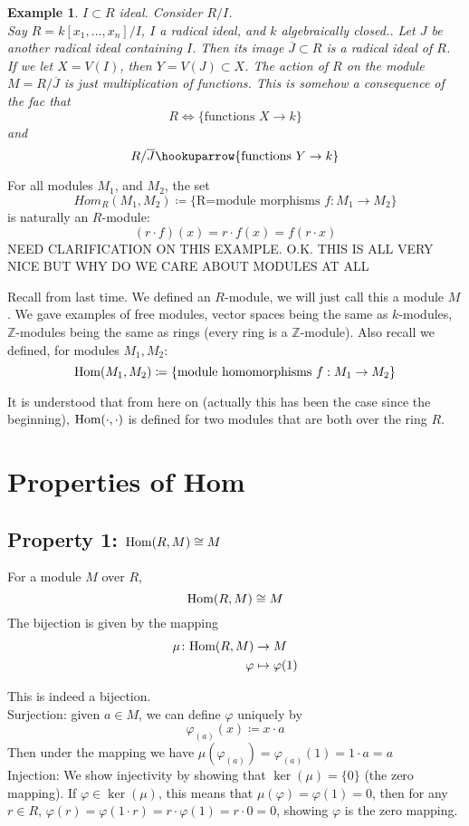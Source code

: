 \documentclass[12pt]{article}
\newcommand{\z}{\mathbb{Z}}
\newcommand{\ho}[2]{\textup{Hom}(#1,#2)}
\newcommand{\mapping}[5]{\begin{align*}
#1\colon #2 &\to #3\\
#4 & \mapsto #5
\end{align*}}
\newtheorem*{eg}{Example}
\theoremstyle{definition}
\begin{document}
\begin{eg}
$I \subset R$ ideal. Consider $R/I$.\\
Say $R=k[x_1,\dots,x_n]/I$, $I$ a radical ideal, and $k$ algebraically closed.. Let $J$ be another radical ideal containing $I$. Then its image $\overline{J}\subset R$ is a radical ideal of $R$.\\
If we let $X=V(I)$, then $Y=V(J)\subset X$. The action of $R$ on the module $M=R/\overline{J}$ is just multiplication of functions. This is somehow a consequence of the fac that
\[
R \iff \{\text{functions $X\rightarrow k$}\}
\]
and
\[
R/\overline{J} \hookuparrow \{\text{functions $Y\rightarrow k$}\}
\]

\end{eg}
For all modules $M_1$, and $M_2$, the set
\[
Hom_R(M_1,M_2)\coloneqq \{\text{R=module morphisms $f:M_1\rightarrow M_2$}\}
\]
is naturally an $R$-module:
\[
(r\cdot f)(x) = r\cdot f(x)=f(r\cdot x)
\]
NEED CLARIFICATION ON THIS EXAMPLE.
O.K. THIS IS ALL VERY NICE BUT WHY DO WE CARE ABOUT MODULES AT ALL

\date{04.10.2018}
Recall from last time. We defined an $R$-module, we will just call this a module $M$. We gave examples of free modules, vector spaces being the same as $k$-modules, $\z$-modules being the same as rings (every ring is a $\z$-module). Also recall we defined, for modules $M_1,M_2$:
\[
\ho{M_1}{M_2} \coloneqq \{\text{module homomorphisms $f:M_1\rightarrow M_2$}\}
\]
    

It is understood that from here on (actually this has been the case since the beginning), $\ho{\cdot}{\cdot}$ is defined for two modules that are both over the ring $R$.
\section*{Properties of Hom}
\subsection*{Property 1: $\ho{R}{M} \cong M$}
For a module $M$ over $R$,
\[
\ho{R}{M} \cong M
\]
The bijection is given by the mapping 
\[
\mapping{\mu}{\ho{R}{M}}{M}{\varphi}{\varphi(1)}
\]

This is indeed a bijection. \\

Surjection: given  $a\in M$, we can define $\varphi$ uniquely by
\[
\varphi_{(a)}(x) \coloneqq x \cdot a
\]
Then under the mapping we have $\mu(\varphi_{(a)})= \varphi_{(a)}(1)=1\cdot a = a$\\
Injection: We show injectivity by showing that $\ker(\mu) = \{0\}$ (the zero mapping). If $\varphi \in \ker(\mu) $, this means that $\mu(\varphi) = \varphi(1) = 0$, then for any $r\in R$, $\varphi(r) = \varphi(1 \cdot r) = r \cdot \varphi(1) = r\cdot 0 = 0$, showing $\varphi$ is the zero mapping.
\end{document}
